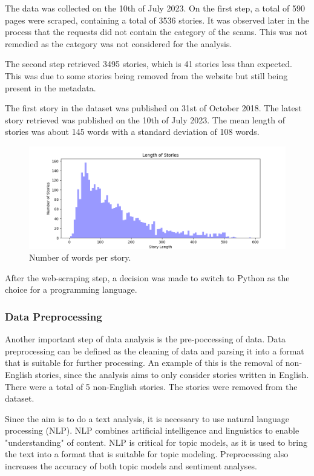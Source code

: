 The data was collected on the 10th of July 2023. On the first step, a total of 590 pages were scraped, containing a total of 3536 stories. It was observed later in the process that the requests did not contain the category of the scams. This was not remedied as the category was not considered for the analysis.

The second step retrieved 3495 stories, which is 41 stories less than expected. This was due to some stories being removed from the website but still being present in the metadata.

The first story in the dataset was published on 31st of October 2018. The latest story retrieved was published on the 10th of July 2023. The mean length of stories was about 145 words with a standard deviation of 108 words.

\begin{figure}[H]
    \centering
    \includegraphics[width=1\textwidth]{resources/story_length.png}
    \caption{Number of words per story.}
    \label{fig:words_per_story}
\end{figure}

After the web-scraping step, a decision was made to switch to Python as the choice for a programming language.

\subsubsection{Data Preprocessing}

Another important step of data analysis is the pre-poccessing of data. Data preprocessing can be defined as the cleaning of data and parsing it into a format that is suitable for further processing. An example of this is the removal of non-English stories, since the analysis aims to only consider stories written in English. There were a total of 5 non-English stories. The stories were removed from the dataset.

Since the aim is to do a text analysis, it is necessary to use natural language processing (NLP). NLP combines artificial intelligence and linguistics to enable "understanding" of content. NLP is critical for topic models, as it is used to bring the text into a format that is suitable for topic modeling. Preprocessing also increases the accuracy of both topic models and sentiment analyses.~\cite{haddi2013role}\cite{chauhan2021topic}

